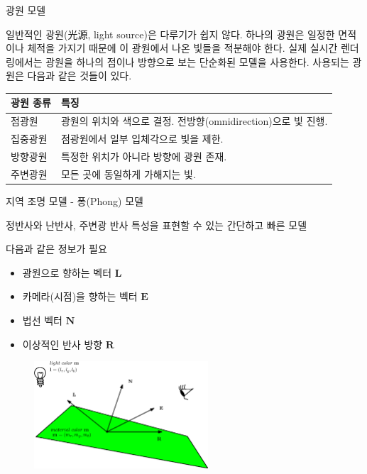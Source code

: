 \documentclass{beamer}
\begin{document}
\begin{frame}[fragile]{광원 모델}

일반적인 광원(光源, light source)은 다루기가 쉽지 않다. 하나의 광원은 일정한 면적이나 체적을 가지기 때문에 이 광원에서 나온 빛들을 적분해야 한다.
실제 실시간 렌더링에서는 광원을 하나의 점이나 방향으로 보는 단순화된 모델을 사용한다. 사용되는 광원은 다음과 같은 것들이 있다.

\begin{center}
    \begin{tabular}{ |l| p{12cm} |}
    \hline
    {\small \sf \bf 광원 종류} & {\small \sf \bf 특징} \\ \hline
    {\small \sf 점광원} & {\small \sf 광원의 위치와 색으로 결정. 전방향(omnidirection)으로 빛 진행.}\\ \hline
    {\small \sf 집중광원 } & {\small \sf 점광원에서 일부 입체각으로 빛을 제한.}\\ \hline
    {\small \sf 방향광원 } & {\small \sf 특정한 위치가 아니라 방향에 광원 존재.} \\ \hline
    {\small \sf 주변광원 } & {\small \sf 모든 곳에 동일하게 가해지는 빛.}\\ \hline
    \end{tabular}
\end{center}

\end{frame}


\begin{frame}[fragile]{지역 조명 모델 - 퐁(Phong) 모델}

정반사와 난반사, 주변광 반사 특성을 표현할 수 있는 간단하고 빠른 모델

다음과 같은 정보가 필요

\begin{itemize}
\item 광원으로 향하는 벡터 $\mathbf L$
\item 카메라(시점)을 향하는 벡터 $\mathbf E$
\item 법선 벡터 $\mathbf N$
\item 이상적인 반사 방향 $\mathbf R$
\end{itemize}


\begin{figure}[h!]
  \centering
    \includegraphics[height=4cm]{OGL_light/lightingVectors.eps}
\end{figure}

\end{frame}
\end{document}
